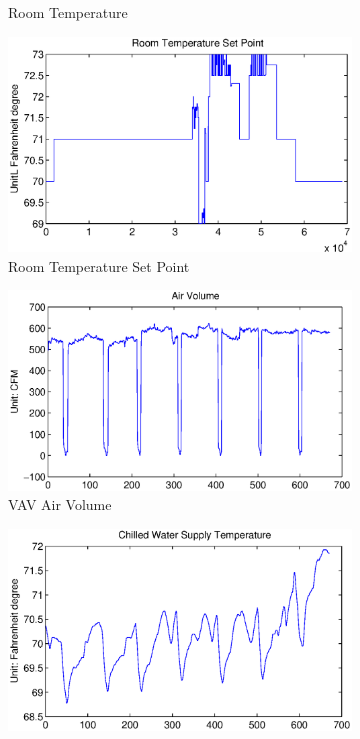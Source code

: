 \begin{figure}[ht!]
\begin{subfigure}{0.32\textwidth}
                \caption{Room Temperature}
  \end{subfigure}
  \begin{subfigure}{0.32\textwidth}
                \centering
    \includegraphics[width=\textwidth]{./fig/stpt.eps}
                \caption{Room Temperature Set Point}
  \end{subfigure}
  \begin{subfigure}{0.32\textwidth}
                \centering
    \includegraphics[width=\textwidth]{./fig/vav.eps}
                \caption{VAV Air Volume}
  \end{subfigure}
  \begin{subfigure}{0.32\textwidth}
                \centering
    \includegraphics[width=\textwidth]{./fig/cwt.eps}

\end{subfigure}
\end{figure}
